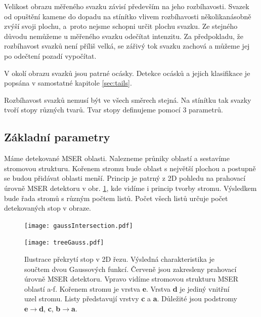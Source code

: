 Velikost obrazu měřeného svazku závisí především na jeho rozbíhavosti. Svazek od opuštění kamene do dopadu na stínítko vlivem rozbíhavosti několikanásobně zvýší svoji plochu, a~proto nejsme schopni určit plochu svazku. Ze stejného důvodu nemůžeme u měřeného svazku odečítat intenzitu. Za předpokladu, že rozbíhavost svazků není příliš velká, se zářivý tok svazku zachová a  můžeme jej po odečtení pozadí vypočítat. %

V okolí obrazu svazků jsou patrné ocásky. Detekce ocásků a jejich klasifikace je popsána v samostatné kapitole \ref{sec:tails}.

Rozbíhavost svazků nemusí být ve všech směrech stejná. Na stínítku tak svazky tvoří stopy různých tvarů. Tvar stopy definujeme pomocí 3 parametrů.

\subsection{Základní parametry}

Máme detekované MSER oblasti. Nalezneme průniky oblastí a sestavíme stromovou strukturu. Kořenem stromu bude oblast s největší plochou a postupně se budou přidávat oblasti menší. Princip je patrný z 2D pohledu na prahovací úrovně MSER detektoru v obr. \ref{fig:gaussIntersection}, kde vidíme i princip tvorby stromu. Výsledkem bude řada stromů s různým počtem listů. Počet všech listů určuje počet detekovaných stop v obraze.

\begin{figure}[htbp]
    \centering
	\begin{minipage}[c]{0.78 \textwidth}
    \texttt{[image: gaussIntersection.pdf]}
    \end{minipage}
    \begin{minipage}[c]{0.16 \textwidth}
    \texttt{[image: treeGauss.pdf]}
    \end{minipage}
    
    
     \caption[]{Ilustrace překrytí stop v 2D řezu. Výsledná charakteristika je součtem dvou Gaussových funkcí. Červeně jsou zakresleny prahovací úrovně MSER detektoru. Vpravo vidíme stromovou strukturu MSER oblastí a-f. Kořenem stromu je vrstva \textbf{e}. Vrstva \textbf{d} je jediný vnitřní uzel stromu. Listy představují vrstvy \textbf{c} a \textbf{a}. Důležité jsou podstromy \textbf{e}$\rightarrow$\textbf{d}, \textbf{c}, \textbf{b}$\rightarrow$\textbf{a}.}
        \label{fig:gaussIntersection}
\end{figure}


